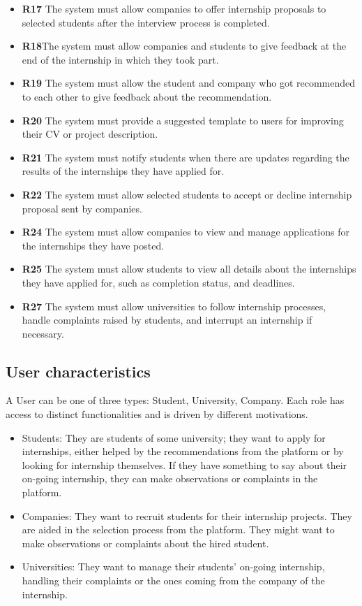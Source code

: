 \documentclass[a4paper,12pt]{article}
\begin{document}
\begin{itemize}
        \item \textbf{R17} The system must allow companies to offer internship proposals to selected students after the interview process is completed.
        \item \textbf{R18}The system must allow companies and students to give feedback at the end of the internship in which they took part.
        \item \textbf{R19} The system must allow the student and company who got recommended to each other to give feedback about the recommendation.
        \item \textbf{R20} The system must provide a suggested template to users for improving their CV or project description.
        \item \textbf{R21} The system must notify students when there are updates regarding the results of the internships they have applied for.
        \item \textbf{R22} The system must allow selected students to accept or decline internship proposal sent by companies.    
        \item \textbf{R24} The system must allow companies to view and manage applications for the internships they have posted.
        \item \textbf{R25} The system must allow students to view all details about the internships they have applied for, such as completion status, and deadlines.
        \item \textbf{R27} The system must allow universities to follow internship processes, handle complaints raised by students, and interrupt an internship if necessary.
        
        \end{itemize}
\subsection{User characteristics}
     A User can be one of three types: Student, University, Company. Each role has access to distinct functionalities and is driven by different motivations.
     \begin{itemize}
        \item Students: They are students of some university; they want to apply for internships, either helped by the recommendations from the platform or by looking for internship themselves. If they have something to say about their on-going internship, they can make observations or complaints in the platform.
        \item Companies: They want to recruit students for their internship projects. They are aided in the selection process from the platform. They might want to make observations or complaints about the hired student.
        \item Universities: They want to manage their students' on-going internship, handling their complaints or the ones coming from the company of the internship.     
     \end{itemize}
\end{document}
